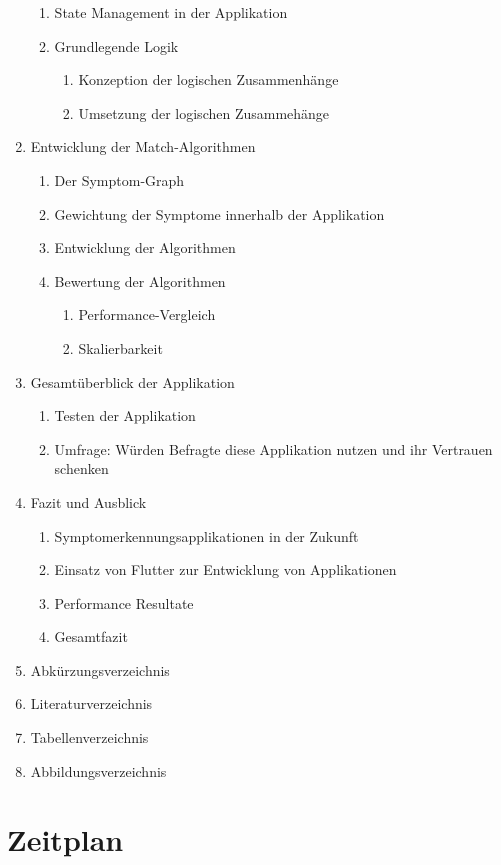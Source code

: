 \begin{enumerate}
\begin{enumerate}
	\item State Management in der Applikation
	\item Grundlegende Logik
		\begin{enumerate}
		\item Konzeption der logischen Zusammenhänge
		\item Umsetzung der logischen Zusammehänge
		\end{enumerate}
	\end{enumerate}
	\item Entwicklung der Match-Algorithmen
	\begin{enumerate}
		\item Der Symptom-Graph
		\item Gewichtung der Symptome innerhalb der Applikation
		\item Entwicklung der Algorithmen
		\item Bewertung der Algorithmen
		\begin{enumerate}
			\item Performance-Vergleich
			\item Skalierbarkeit
		\end{enumerate}
	\end{enumerate}
	\item Gesamtüberblick der Applikation
	\begin{enumerate}
		\item Testen der Applikation
		\item Umfrage: Würden Befragte diese Applikation nutzen und ihr Vertrauen schenken
	\end{enumerate}
	\item Fazit und Ausblick
		\begin{enumerate}
		\item Symptomerkennungsapplikationen in der Zukunft
		\item Einsatz von Flutter zur Entwicklung von Applikationen
		\item Performance Resultate
		\item Gesamtfazit
	\end{enumerate}
	\item Abkürzungsverzeichnis
	\item Literaturverzeichnis
	\item Tabellenverzeichnis
	\item Abbildungsverzeichnis

\end{enumerate}
\section{Zeitplan}

